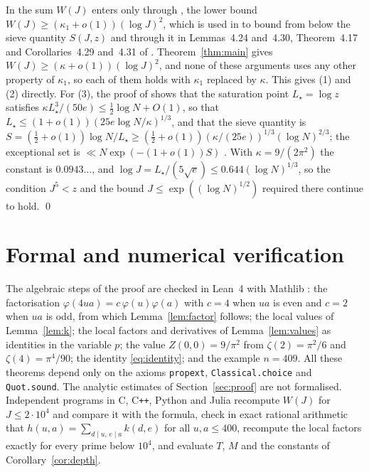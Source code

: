 \documentclass{amsart}
\theoremstyle{definition}
\theoremstyle{remark}
\numberwithin{equation}{section}
\begin{document}
In \cite{Dah} the sum $W(J)$ enters only through \cite[Lemma~4.22]{Dah}, the lower bound $W(J)\ge(\kappa_1+o(1))(\log J)^2$, which is used in \cite[Lemma~4.23]{Dah} to bound from below the sieve quantity $S(J,z)$ and through it in Lemmas~4.24 and~4.30, Theorem~4.17 and Corollaries~4.29 and~4.31 of \cite{Dah}. Theorem~\ref{thm:main} gives $W(J)\ge(\kappa+o(1))(\log J)^2$, and none of these arguments uses any other property of $\kappa_1$, so each of them holds with $\kappa_1$ replaced by $\kappa$. This gives (1) and (2) directly. For (3), the proof of \cite[Corollary~4.31]{Dah} shows that the saturation point $L_\star=\log z$ satisfies $\kappa L_\star^3/(50e)\le\frac12\log N+O(1)$, so that $L_\star\le(1+o(1))(25e\log N/\kappa)^{1/3}$, and that the sieve quantity is $S=(\frac12+o(1))\log N/L_\star\ge(\frac12+o(1))(\kappa/(25e))^{1/3}(\log N)^{2/3}$; the exceptional set is $\ll N\exp(-(1+o(1))S)$ \cite[Theorem~4.28]{Dah}. With $\kappa=9/(2\pi^2)$ the constant is $0.0943\ldots$, and $\log J=L_\star/(5\sqrt e)\le0.644(\log N)^{1/3}$, so the condition $J^5<z$ and the bound $J\le\exp((\log N)^{1/2})$ required there continue to hold. \qed

\section{Formal and numerical verification}\label{sec:verification}

The algebraic steps of the proof are checked in Lean~4 \cite{Lean} with Mathlib \cite{Mathlib}: the factorisation $\varphi(4ua)=c\,\varphi(u)\varphi(a)$ with $c=4$ when $ua$ is even and $c=2$ when $ua$ is odd, from which Lemma~\ref{lem:factor} follows; the local values of Lemma~\ref{lem:k}; the local factors and derivatives of Lemma~\ref{lem:values} as identities in the variable $p$; the value $Z(0,0)=9/\pi^2$ from $\zeta(2)=\pi^2/6$ and $\zeta(4)=\pi^4/90$; the identity \eqref{eq:identity}; and the example $n=409$. All these theorems depend only on the axioms \texttt{propext}, \texttt{Classical.choice} and \texttt{Quot.sound}. The analytic estimates of Section~\ref{sec:proof} are not formalised. Independent programs in C, C\texttt{++}, Python and Julia recompute $W(J)$ for $J\le2\cdot10^4$ and compare it with the formula, check in exact rational arithmetic that $h(u,a)=\sum_{d\mid u,\,e\mid a}k(d,e)$ for all $u,a\le400$, recompute the local factors exactly for every prime below $10^4$, and evaluate $T$, $M$ and the constants of Corollary~\ref{cor:depth}.

\appendix
\end{document}
